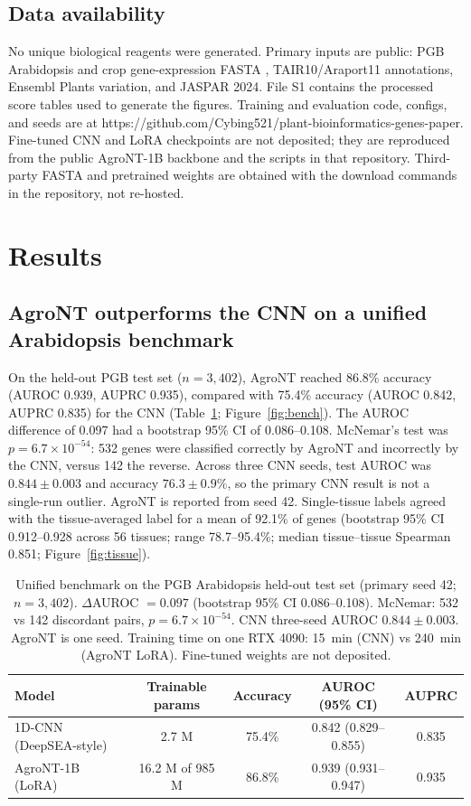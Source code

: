 \documentclass[9pt,twocolumn,twoside,lineno]{gsag3jnl}
\begin{document}
\subsection{Data availability}

No unique biological reagents were generated. Primary inputs are public: PGB Arabidopsis and crop gene-expression FASTA \citep{pgb2024}, TAIR10/Araport11 annotations, Ensembl Plants variation, and JASPAR 2024. File S1 contains the processed score tables used to generate the figures. Training and evaluation code, configs, and seeds are at https://github.com/Cybing521/plant-bioinformatics-genes-paper. Fine-tuned CNN and LoRA checkpoints are not deposited; they are reproduced from the public AgroNT-1B backbone and the scripts in that repository. Third-party FASTA and pretrained weights are obtained with the download commands in the repository, not re-hosted.

\section{Results}

\subsection{AgroNT outperforms the CNN on a unified Arabidopsis benchmark}

On the held-out PGB test set ($n = 3{,}402$), AgroNT reached 86.8\% accuracy (AUROC 0.939, AUPRC 0.935), compared with 75.4\% accuracy (AUROC 0.842, AUPRC 0.835) for the CNN (Table~\ref{tab:bench}; Figure~\ref{fig:bench}). The AUROC difference of 0.097 had a bootstrap 95\% CI of 0.086--0.108. McNemar's test was $p = 6.7\times10^{-54}$: 532 genes were classified correctly by AgroNT and incorrectly by the CNN, versus 142 the reverse. Across three CNN seeds, test AUROC was $0.844\pm0.003$ and accuracy $76.3\pm0.9\%$, so the primary CNN result is not a single-run outlier. AgroNT is reported from seed 42. Single-tissue labels agreed with the tissue-averaged label for a mean of 92.1\% of genes (bootstrap 95\% CI 0.912--0.928 across 56 tissues; range 78.7--95.4\%; median tissue--tissue Spearman 0.851; Figure~\ref{fig:tissue}).

\begin{table}[t]
\centering
\small
\caption{Unified benchmark on the PGB Arabidopsis held-out test set (primary seed 42; $n = 3{,}402$). $\Delta$AUROC $= 0.097$ (bootstrap 95\% CI 0.086--0.108). McNemar: 532 vs 142 discordant pairs, $p = 6.7\times10^{-54}$. CNN three-seed AUROC $0.844\pm0.003$. AgroNT is one seed. Training time on one RTX 4090: 15~min (CNN) vs 240~min (AgroNT LoRA). Fine-tuned weights are not deposited.}
\label{tab:bench}
\begin{tabular}{lcccc}
\toprule
Model & Trainable params & Accuracy & AUROC (95\% CI) & AUPRC \\
\midrule
1D-CNN (DeepSEA-style) & 2.7 M & 75.4\% & 0.842 (0.829--0.855) & 0.835 \\
AgroNT-1B (LoRA) & 16.2 M of 985 M & 86.8\% & 0.939 (0.931--0.947) & 0.935 \\
\bottomrule
\end{tabular}
\end{table}
\end{document}

